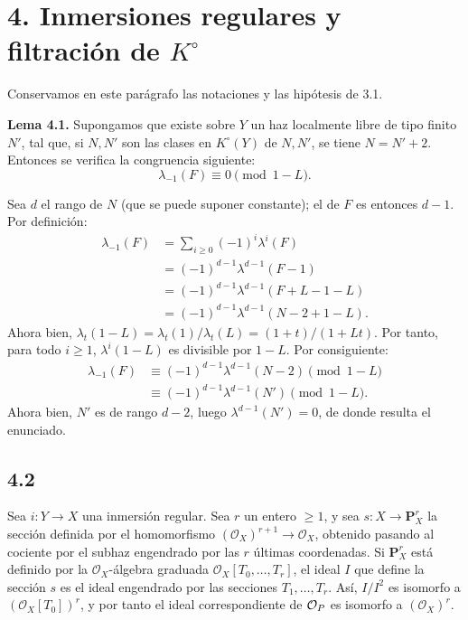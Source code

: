 \providecommand{\sisi}[2]{#2}

\section*{4. Inmersiones regulares y filtración de \(K^\circ\)}

Conservamos en este parágrafo las notaciones y las hipótesis de 3.1.

\textbf{Lema 4.1.} Supongamos que existe sobre \(Y\) un haz localmente libre de tipo finito \(N'\), tal que, si \(N,N'\) son las clases en \(K^\circ(Y)\) de \(N,N'\), se tiene \(N=N'+2\). Entonces se verifica la congruencia siguiente:
\[
  \lambda_{-1}(F)\equiv 0 \pmod{1-L}.
\]

Sea \(d\) el rango de \(N\) (que se puede suponer constante); el de \(F\) es entonces \(d-1\). Por definición:
\[
\begin{aligned}
\lambda_{-1}(F)
 &= \sum_{i\ge0}(-1)^i\lambda^i(F)\\
 &= (-1)^{d-1}\lambda^{d-1}(F-1)\\
 &= (-1)^{d-1}\lambda^{d-1}(F+L-1-L)\\
 &= (-1)^{d-1}\lambda^{d-1}(N-2+1-L).
\end{aligned}
\]
Ahora bien, \(\lambda_t(1-L)=\lambda_t(1)/\lambda_t(L)=(1+t)/(1+Lt)\). Por tanto, para todo \(i\ge1\), \(\lambda^i(1-L)\) es divisible por \(1-L\). Por consiguiente:
\[
\begin{aligned}
\lambda_{-1}(F)
  &\equiv (-1)^{d-1}\lambda^{d-1}(N-2) \pmod{1-L}\\
  &\equiv(-1)^{d-1}\lambda^{d-1}(N') \pmod{1-L}.
\end{aligned}
\]
Ahora bien, \(N'\) es de rango \(d-2\), luego \(\lambda^{d-1}(N')=0\), de donde resulta el enunciado.

\subsection*{4.2}

Sea \(i:Y\to X\) una inmersión regular. Sea \(r\) un entero \(\ge1\), y sea \(s:X\longrightarrow \mathbf P_X^r\) la sección definida por el homomorfismo \((\mathcal O_X)^{r+1}\to\mathcal O_X\), obtenido pasando al cociente por el subhaz engendrado por las \(r\) últimas coordenadas. Si \(\mathbf P_X^r\) está definido por la \(\mathcal O_X\)-álgebra graduada \(\mathcal O_X[T_0,\ldots,T_r]\), el ideal \(I\) que define la sección \(s\) es el ideal engendrado por las secciones \(T_1,\ldots,T_r\). Así, \(I/I^2\) es isomorfo a \((\mathcal O_X[T_0])^r\), y por tanto el ideal correspondiente de \(\mathcal O_P\) es isomorfo a \((\mathcal O_X)^r\).

